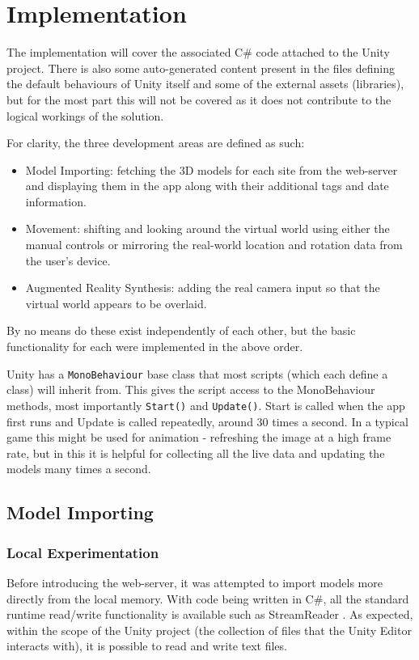 \documentclass[12pt, a4paper]{article}
\begin{document}
\newpage
\section{Implementation}
\label{implementation}
The implementation will cover the associated C\# code attached to the Unity project. There is also some auto-generated content present in the files defining the default behaviours of Unity itself and some of the external assets (libraries), but for the most part this will not be covered as it does not contribute to the logical workings of the solution.

For clarity, the three development areas are defined as such:
\begin{itemize}
    \item Model Importing: fetching the 3D models for each site from the web-server and displaying them in the app along with their additional tags and date information.
    \item Movement: shifting and looking around the virtual world using either the manual controls or mirroring the real-world location and rotation data from the user's device. 
    \item Augmented Reality Synthesis: adding the real camera input so that the virtual world appears to be overlaid.
\end{itemize}
By no means do these exist independently of each other, but the basic functionality for each were implemented in the above order.

Unity has a \verb|MonoBehaviour| base class that most scripts (which each define a class) will inherit from. This gives the script access to the MonoBehaviour methods, most importantly \verb|Start()| and \verb|Update()|. Start is called when the app first runs and Update is called repeatedly, around 30 times a second. In a typical game this might be used for animation - refreshing the image at a high frame rate, but in this it is helpful for collecting all the live data and updating the models many times a second. 

\subsection{Model Importing}
\label{modelimporting}

\subsubsection{Local Experimentation}
\label{initiallocalattempt}
Before introducing the web-server, it was attempted to import models more directly from the local memory. With code being written in C\#, all the standard runtime read/write functionality is available such as StreamReader \cite{models:streamreader}. As expected, within the scope of the Unity project (the collection of files that the Unity Editor interacts with), it is possible to read and write text files.
\end{document}
